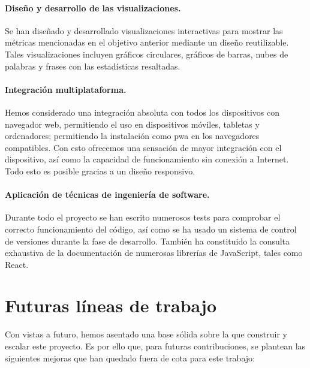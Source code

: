 \paragraph{Diseño y desarrollo de las visualizaciones.} Se han diseñado y desarrollado visualizaciones interactivas para mostrar las métricas mencionadas en el objetivo anterior mediante un diseño reutilizable. Tales visualizaciones incluyen gráficos circulares, gráficos de barras, nubes de palabras y frases con las estadísticas resaltadas.

\paragraph{Integración multiplataforma.} Hemos considerado una integración absoluta con todos los dispositivos con navegador web, permitiendo el uso en dispositivos móviles, tabletas y ordenadores; permitiendo la instalación como \acrshort{pwa} en los navegadores compatibles. Con esto ofrecemos una sensación de mayor integración con el dispositivo, así como la capacidad de funcionamiento sin conexión a Internet. Todo esto es posible gracias a un diseño responsivo.

\paragraph{Aplicación de técnicas de ingeniería de software.} Durante todo el proyecto se han escrito numerosos tests para comprobar el correcto funcionamiento del código, así como se ha usado un sistema de control de versiones durante la fase de desarrollo. También ha constituido la consulta exhaustiva de la documentación de numerosas librerías de JavaScript, tales como React.



\section{Futuras líneas de trabajo}
\label{sec:future-work}

Con vistas a futuro, hemos asentado una base sólida sobre la que construir y escalar este proyecto. Es por ello que, para futuras contribuciones, se plantean las siguientes mejoras que han quedado fuera de cota para este trabajo:

